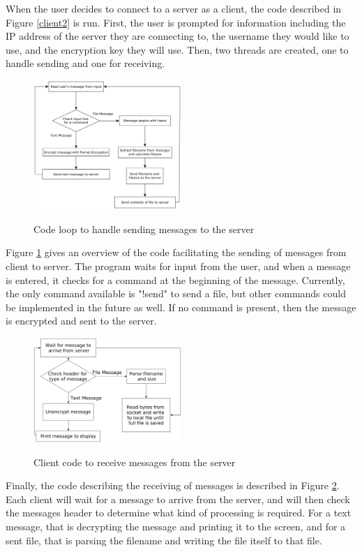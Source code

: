 \documentclass{article}
\begin{document}
When the user decides to connect to a server as a client, the code described in Figure \ref{client2} is run. First, the user is prompted for information including the IP address of the server they are connecting to, the username they would like to use, and the encryption key they will use. Then, two threads are created, one to handle sending and one for receiving.

\begin{figure}[h]
\caption{Code loop to handle sending messages to the server}
\centering
\includegraphics[width=0.5\textwidth]{media/clientFlowchart1.png}
\label{client1}
\end{figure}

Figure \ref{client1} gives an overview of the code facilitating the sending of messages from client to server. The program waits for input from the user, and when a message is entered, it checks for a command at the beginning of the message. Currently, the only command available is "!send" to send a file, but other commands could be implemented in the future as well. If no command is present, then the message is encrypted and sent to the server.

\begin{figure}[h]
\caption{Client code to receive messages from the server}
\centering
\includegraphics[width=0.5\textwidth]{media/clientFlowchart3.png}
\label{client3}
\end{figure}

Finally, the code describing the receiving of messages is described in Figure \ref{client3}. Each client will wait for a message to arrive from the server, and will then check the messages header to determine what kind of processing is required. For a text message, that is decrypting the message and printing it to the screen, and for a sent file, that is parsing the filename and writing the file itself to that file.
\end{document}
